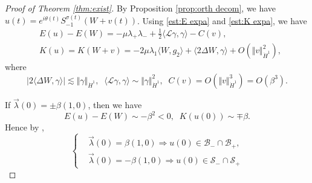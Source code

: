 \documentclass[reqno, 11pt]{amsart}
\numberwithin{equation}{section}
\theoremstyle{plain}
\theoremstyle{definition}
\numberwithin{equation}{section}
\numberwithin{theorem}{section}
\numberwithin{equation}{section}
\numberwithin{equation}{section}
\numberwithin{theorem}{section}
\begin{document}
\begin{proof}[Proof of Theorem \ref{thm:exist}]
		By Proposition \ref{prop:orth decom}, we have $u(t)=e^{i\theta(t)}S_{-1}^{\sigma(t)}\left(W+v(t) \right)$. Using \eqref{est:E expa} and \eqref{est:K expa}, we have
		\begin{align*}
		&E(u)-E(W)=-\mu\lambda_+\lambda_-+\frac{1}{2}\langle \mathcal{L}\gamma,\gamma \rangle-C(v),\\&K(u)=K(W+v)=-2\mu\lambda_{1} \langle W,g_2 \rangle+\langle 2\Delta W,\gamma \rangle+O(\Vert v\Vert_{\dot H^1}^2),
		\end{align*}
		where
		\begin{equation*}
		|2\langle\Delta W, \gamma\rangle|\lesssim\Vert \gamma\Vert_{\dot H^1},\;\;\langle\mathcal{L}\gamma,\gamma  \rangle\sim\Vert \gamma\Vert_{\dot H^1}^2,\;\;C(v)=O(\Vert v\Vert_{\dot H^1}^3)=O(\beta^3).
		\end{equation*}
		
		If $\vec{\lambda}(0)=\pm\beta(1,0)$, then we have
		\begin{equation*}
		E(u)-E(W)\sim -\beta^2<0,\;\;K(u(0))\sim \mp\beta.
		\end{equation*}
		Hence by \cite{MXZ:crit Hart:f rad},
		\begin{equation*}
		\left\{\begin{aligned}
		&\vec{\lambda}(0)=\beta(1,0) \Longrightarrow u(0)\in \mathcal{B}_{-}\cap \mathcal{B}_{+},\\
		&\vec{\lambda}(0)=-\beta(1,0) \Longrightarrow u(0)\in \mathcal{S}_{-}\cap \mathcal{S}_{+} \end{aligned}\right.
		\end{equation*}
		

\end{proof}
\end{document}
